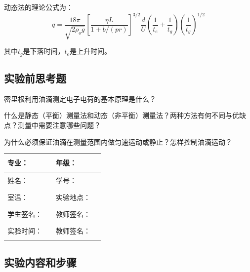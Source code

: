 \documentclass[dvipsnames, svgnames,a4paper,11pt]{article}
\newcommand{\recordblank}[1]{\par\vspace*{#1}\par}
\begin{document}
动态法的理论公式为：
\begin{equation}
q=\frac{18 \pi}{\sqrt{2 \rho_o g}}\left[\frac{\eta L}{1+b /(p r)}\right]^{3 / 2} \frac{d}{U}\left(\frac{1}{t_e}+\frac{1}{t_g}\right)\left(\frac{1}{t_g}\right)^{1 / 2}\label{equ:dynamic_formula}
\end{equation}

其中$t_g$是下落时间，$t_e$是上升时间。

\subsection{实验前思考题}

\begin{question}
密里根利用油滴测定电子电荷的基本原理是什么？
\end{question}
\recordblank{4cm}

\begin{question}
什么是静态（平衡）测量法和动态（非平衡）测量法？两种方法有何不同与优缺点？测量中需要注意哪些问题？
\end{question}
\recordblank{4cm}

\begin{question}
为什么必须保证油滴在测量范围内做匀速运动或静止？怎样控制油滴运动？
\end{question}
\recordblank{4cm}

\clearpage
\begin{table}
	\renewcommand\arraystretch{1.7}
	\centering
	\begin{tabularx}{\textwidth}{|X|X|X|X|}
	\hline
	专业：& \rule{2.5cm}{0.4pt} & 年级：& \rule{2.5cm}{0.4pt}\\
	\hline
	姓名：& \rule{2.5cm}{0.4pt} & 学号：& \rule{2.5cm}{0.4pt}\\
	\hline
	室温：& \rule{2.5cm}{0.4pt} & 实验地点：& \rule{2.5cm}{0.4pt}\\
	\hline
	学生签名：& \rule{2.5cm}{0.4pt} & 教师签名：& \rule{2.5cm}{0.4pt}\\
	\hline
	实验时间：& \rule{2.5cm}{0.4pt} & 教师签名：& \rule{2.5cm}{0.4pt}\\
	\hline
	\end{tabularx}
\end{table}


\subsection{实验内容和步骤}
\end{document}
